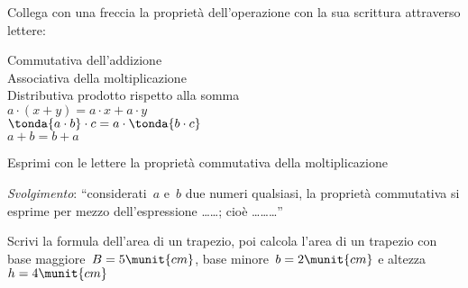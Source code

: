 

\begin{esercizio}
\label{ese:8.5}
Collega con una freccia la proprietà dell'operazione con la sua 
scrittura  attraverso lettere:
\begin{htmulticols}{2}
\noindent
Commutativa dell'addizione\\
Associativa della moltiplicazione\\
Distributiva prodotto rispetto alla somma\\
\(a\cdot (x+y)=a\cdot x+a\cdot y\)\\
\(\tonda{a\cdot b}\cdot c=a\cdot \tonda{b\cdot c}\)\\
\({a+b=b+a}\)
\end{htmulticols}
\end{esercizio}

\begin{esercizio}
\label{ese:8.6}
Esprimi con le lettere la proprietà commutativa della moltiplicazione

\emph{Svolgimento}: ``considerati~\(a\) e~\(b\) due numeri qualsiasi, 
la proprietà commutativa si esprime per mezzo dell'espressione 
\ldots\ldots; cioè \ldots\ldots\ldots''
\end{esercizio}

\begin{esercizio}
\label{ese:8.7}
Scrivi la formula dell'area di un trapezio, poi calcola l'area di un 
trapezio con base maggiore~\(B=5\munit{cm}\), base minore~\(b=2\munit{cm}\) 
e altezza~\(h=4\munit{cm}\)
\end{esercizio}

